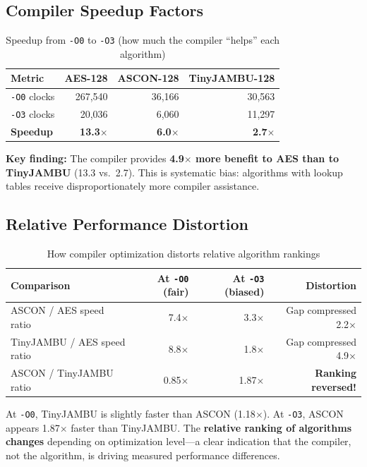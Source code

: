 \documentclass[11pt,a4paper]{article}
\begin{document}
\subsection{Compiler Speedup Factors}

\begin{table}[H]
\centering
\caption{Speedup from {\tt -O0} to {\tt -O3} (how much the compiler ``helps'' each algorithm)}
\label{tab:speedup}
\begin{tabular}{lrrr}
\toprule
\textbf{Metric} & \textbf{AES-128} & \textbf{ASCON-128} & \textbf{TinyJAMBU-128} \\
\midrule
{\tt -O0} clocks & 267,540 & 36,166 & 30,563 \\
{\tt -O3} clocks & 20,036 & 6,060 & 11,297 \\
\textbf{Speedup} & \textbf{13.3$\times$} & \textbf{6.0$\times$} & \textbf{2.7$\times$} \\
\bottomrule
\end{tabular}
\end{table}

\textbf{Key finding:} The compiler provides \textbf{4.9$\times$ more benefit to AES than to TinyJAMBU} (13.3 vs.\ 2.7). This is systematic bias: algorithms with lookup tables receive disproportionately more compiler assistance.

\subsection{Relative Performance Distortion}

\begin{table}[H]
\centering
\caption{How compiler optimization distorts relative algorithm rankings}
\label{tab:distortion}
\begin{tabular}{lrrr}
\toprule
\textbf{Comparison} & \textbf{At {\tt -O0} (fair)} & \textbf{At {\tt -O3} (biased)} & \textbf{Distortion} \\
\midrule
ASCON / AES speed ratio & 7.4$\times$ & 3.3$\times$ & Gap compressed 2.2$\times$ \\
TinyJAMBU / AES speed ratio & 8.8$\times$ & 1.8$\times$ & Gap compressed 4.9$\times$ \\
ASCON / TinyJAMBU ratio & 0.85$\times$ & 1.87$\times$ & \textbf{Ranking reversed!} \\
\bottomrule
\end{tabular}
\end{table}

At {\tt -O0}, TinyJAMBU is slightly faster than ASCON (1.18$\times$). At {\tt -O3}, ASCON appears 1.87$\times$ faster than TinyJAMBU. The \textbf{relative ranking of algorithms changes} depending on optimization level---a clear indication that the compiler, not the algorithm, is driving measured performance differences.
\end{document}
